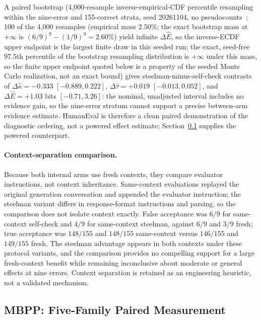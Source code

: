 \documentclass[a4paper,journal]{IAENGtran}
\begin{document}
A paired bootstrap (4,000-resample inverse-empirical-CDF percentile resampling within
the nine-error and 155-correct strata, seed 20261104, no
pseudocounts~\cite{efron1979bootstrap}; 100 of the 4,000 resamples (empirical mass
$2.50\%$; the exact bootstrap mass at $+\infty$ is $(6/9)^9-(1/9)^9=2.60\%$) yield
infinite $\Delta\hat E$, so the inverse-ECDF upper endpoint is the largest finite
draw in this seeded run; the exact, seed-free $97.5$th percentile of the bootstrap
resampling distribution is $+\infty$ under this mass, so the finite upper endpoint
quoted below is a property of the seeded Monte Carlo realization, not an exact bound)
gives steelman-minus-self-check contrasts of
$\Delta\hat\kappa=-0.333$ $[-0.889,0.222]$, $\Delta\hat\tau=+0.019$
$[-0.013,0.052]$, and $\Delta\hat E=+1.03$ bits $[-0.71,3.26]$: the nominal,
unadjusted interval includes no evidence gain, so the nine-error stratum cannot support
a precise between-arm evidence estimate. HumanEval is therefore a clean paired
demonstration of the diagnostic ordering, not a powered effect estimate;
Section~\ref{sec:mbpp} supplies the powered counterpart.

\paragraph{Context-separation comparison.} Because both internal arms use fresh
contexts, they compare evaluator instructions, not context inheritance. Same-context
evaluations replayed the original generation conversation and appended the evaluator
instruction; the steelman variant differs in response-format instructions and parsing,
so the comparison does not isolate context exactly. False acceptance was $6/9$ for
same-context self-check and $4/9$ for same-context steelman, against $6/9$ and $3/9$
fresh; true acceptance was $148/155$ and $148/155$ same-context versus $146/155$ and
$149/155$ fresh. The steelman advantage appears in both contexts under these protocol
variants, and the comparison provides no compelling support for a large fresh-context
benefit while remaining inconclusive about moderate or general effects at nine errors.
Context separation is retained as an engineering heuristic, not a validated mechanism.

\subsection{MBPP: Five-Family Paired Measurement}
\label{sec:mbpp}
\end{document}
